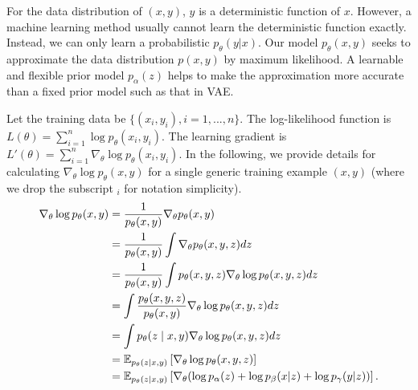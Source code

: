 \documentclass[accepted]{uai2023} %
\begin{document}
For the data distribution of $(x, y)$, $y$ is a deterministic function of $x$. However, a machine learning method usually cannot learn the deterministic function exactly. Instead, we can only learn a probabilistic $p_\theta(y|x)$. Our model $p_\theta(x, y)$ seeks to approximate the data distribution $p(x, y)$ by maximum likelihood. A learnable and flexible prior model $p_\alpha(z)$ helps to make the approximation more accurate than a fixed prior model such as that in VAE. 

Let the training data be $\{(x_i, y_i), i = 1, ..., n\}$. The log-likelihood function is $L( \theta) = \sum_{i=1}^{n} \log p_\theta(x_i, y_i)$. The learning gradient is $L'( \theta) = \sum_{i=1}^{n} \nabla_\theta \log p_\theta(x_i, y_i)$. 
In the following, we provide details for calculating $\nabla_\theta \log p_\theta(x, y)$ for a single generic training example $(x, y)$ (where we drop the subscript $_i$ for notation simplicity).
\begin{align*} 
   \nabla_\theta  \log p_\theta(x, y) &= \frac{1}{p_\theta(x, y)} \nabla_\theta p_\theta(x, y)\\
    &= \frac{1}{p_\theta(x, y)} \int \nabla_\theta p_\theta(x, y, z) dz\\
    &= \frac{1}{p_\theta(x, y)} \int p_\theta(x, y, z) \nabla_\theta \log p_\theta(x, y, z) dz\\
    &=  \int \frac{p_\theta(x, y, z)}{p_\theta(x, y)} \nabla_\theta \log p_\theta(x, y, z) dz\\
    &=  \int p_\theta(z \mid x, y) \nabla_\theta \log p_\theta(x, y, z) dz\\
   & = \mathbb{E}_{p_\theta(z|x, y)} \left[ \nabla_\theta \log p_\theta(x, y, z) \right] \\
     &= \mathbb{E}_{p_\theta(z|x, y)} \left[ \nabla_\theta (\log p_\alpha(z) + \log p_\beta(x|z) + \log p_\gamma(y|z)) \right].
\end{align*}
\end{document}
